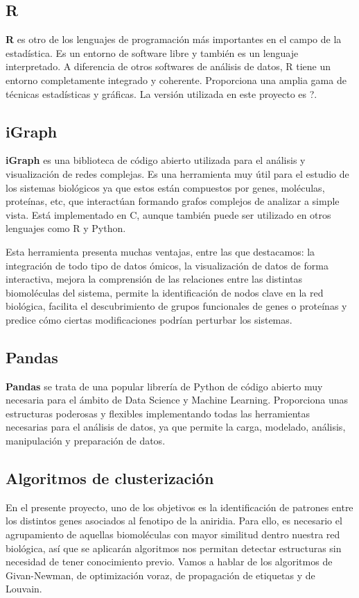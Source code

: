 \subsection{R}
\textbf{R} es otro de los lenguajes de programación más importantes en el campo de la estadística. Es un entorno de software libre y también es un lenguaje interpretado. A diferencia de otros softwares de análisis de datos, R tiene un entorno completamente integrado y coherente. Proporciona una amplia gama de técnicas estadísticas y gráficas. La versión utilizada en este proyecto es ?.

\subsection{iGraph}
\textbf{iGraph} es una biblioteca de código abierto utilizada para el análisis y visualización de redes complejas. Es una herramienta muy útil para el estudio de los sistemas biológicos ya que estos están compuestos por genes, moléculas, proteínas, etc, que interactúan formando grafos complejos de analizar a simple vista. Está implementado en C, aunque también puede ser utilizado en otros lenguajes como R y Python. 

Esta herramienta presenta muchas ventajas, entre las que destacamos: la integración de todo tipo de datos ómicos, la visualización de datos de forma interactiva, mejora la comprensión de las relaciones entre las distintas biomoléculas del sistema, permite la identificación de nodos clave en la red biológica, facilita el descubrimiento de grupos funcionales de genes o proteínas y predice cómo ciertas modificaciones podrían perturbar los sistemas.

\subsection{Pandas}
\textbf{Pandas} se trata de una popular librería de Python de código abierto muy necesaria para el ámbito de Data Science y Machine Learning. Proporciona unas estructuras poderosas y flexibles implementando todas las herramientas necesarias para el análisis de datos, ya que permite la carga, modelado, análisis, manipulación y preparación de datos.

\subsection{Algoritmos de clusterización}
En el presente proyecto, uno de los objetivos es la identificación de patrones entre los distintos genes asociados al fenotipo de la aniridia. Para ello, es necesario el agrupamiento de aquellas biomoléculas con mayor similitud dentro nuestra red biológica, así que se aplicarán algoritmos nos permitan detectar estructuras sin necesidad de tener conocimiento previo. Vamos a hablar de los algoritmos de Givan-Newman, de optimización voraz, de propagación de etiquetas y de Louvain.

